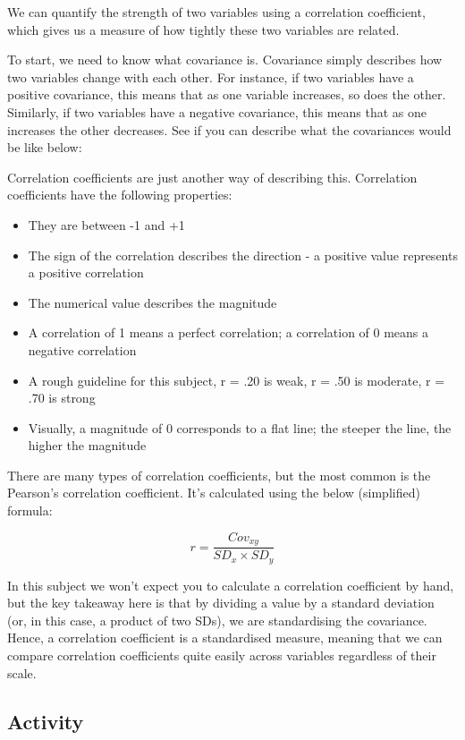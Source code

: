 \documentclass[
]{book}
\providecommand{\tightlist}{%
  \setlength{\itemsep}{0pt}\setlength{\parskip}{0pt}}
\begin{document}
We can quantify the strength of two variables using a correlation coefficient, which gives us a measure of how tightly these two variables are related.

To start, we need to know what covariance is. Covariance simply describes how two variables change with each other. For instance, if two variables have a positive covariance, this means that as one variable increases, so does the other. Similarly, if two variables have a negative covariance, this means that as one increases the other decreases. See if you can describe what the covariances would be like below:



Correlation coefficients are just another way of describing this. Correlation coefficients have the following properties:

\begin{itemize}
\tightlist
\item
  They are between -1 and +1
\item
  The sign of the correlation describes the direction - a positive value represents a positive correlation
\item
  The numerical value describes the magnitude
\item
  A correlation of 1 means a perfect correlation; a correlation of 0 means a negative correlation
\item
  A rough guideline for this subject, r = .20 is weak, r = .50 is moderate, r = .70 is strong
\item
  Visually, a magnitude of 0 corresponds to a flat line; the steeper the line, the higher the magnitude
\end{itemize}

There are many types of correlation coefficients, but the most common is the Pearson's correlation coefficient. It's calculated using the below (simplified) formula:

\[
r = \frac{Cov_{xy}}{SD_x \times SD_y}
\]

In this subject we won't expect you to calculate a correlation coefficient by hand, but the key takeaway here is that by dividing a value by a standard deviation (or, in this case, a product of two SDs), we are standardising the covariance. Hence, a correlation coefficient is a standardised measure, meaning that we can compare correlation coefficients quite easily across variables regardless of their scale.

\subsection{Activity}\label{activity}
\end{document}
